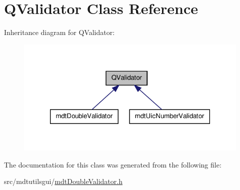 \hypertarget{class_q_validator}{\section{Q\-Validator Class Reference}
\label{class_q_validator}
}


Inheritance diagram for Q\-Validator\-:\nopagebreak
\begin{figure}[H]
\begin{center}
\leavevmode
\includegraphics[width=320pt]{class_q_validator__inherit__graph}
\end{center}
\end{figure}


The documentation for this class was generated from the following file\-:\begin{DoxyCompactItemize}
\item 
src/mdtutilsgui/\hyperlink{mdt_double_validator_8h}{mdt\-Double\-Validator.\-h}\end{DoxyCompactItemize}

